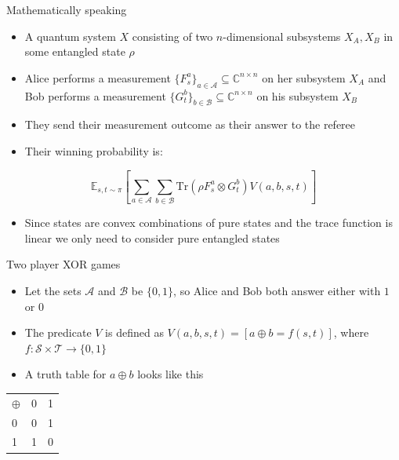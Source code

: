 \begin{frame}{Mathematically speaking}
\begin{itemize}
    \item A quantum system $X$ consisting of two $n$-dimensional subsystems $X_A, X_B$ in some entangled state $\rho$
    \item Alice performs a measurement $\{ F_s^a \}_{a\in \mathcal{A}}\subseteq \mathbb{C}^{n \times n}$ on her subsystem $X_A$ and Bob performs a measurement $\{ G_t^b\}_{b \in \mathcal{B}} \subseteq \mathbb{C}^{n \times n}$ on his subsystem $X_B$
    \item They send their measurement outcome as their answer to the referee
    \item Their winning probability is:
\end{itemize}
\begin{equation*}
\mathbb{E}_{s,t \sim \pi} \left[ \sum_{a \in \mathcal{A}} \sum_{b \in \mathcal{B}} \text{Tr}(\rho F_s^a \otimes G_t^b) V(a,b,s,t) \right]
\end{equation*}  
\end{frame}

\begin{frame}{}
\begin{itemize}
    \item Since states are convex combinations of pure states and the trace function is linear we only need to consider pure entangled states
    
\end{itemize}
\end{frame}

\begin{frame}{Two player XOR games}
\begin{itemize}
    \item Let the sets $\mathcal{A}$ and $\mathcal{B}$ be $\{0,1\}$, so Alice and Bob both answer either with $1$ or $0$
    \item The predicate $V$ is defined as $V(a,b,s,t) = [ a\oplus b = f(s,t)]$, where $f: \mathcal{S} \times \mathcal{T} \rightarrow \{0,1\}$
    \item A truth table for $a \oplus b$ looks like this
\end{itemize}
    \begin{center}
\begin{tabular}{l | c r }
$\oplus$ & 0 & 1 \\
\cline{1-3} 

0 & 0 & 1 \\
1 & 1 & 0 
\end{tabular}\\
\end{center}
\end{frame}


